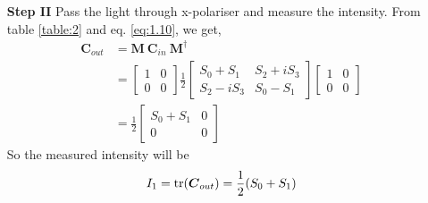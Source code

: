 \documentclass[11pt,a4paper]{article}
\numberwithin{equation}{section}
\begin{document}
\begin{enumerate}
 \item[\textbf{Step II}] 
 Pass the light through x-polariser and measure the intensity. From table \ref{table:2} and eq. \ref{eq:1.10}, we get,
 \begin{align}
 	\boldsymbol{C}_{out} &= \boldsymbol{M}\:\boldsymbol{C}_{in}\:\boldsymbol{M}^\dagger\nonumber\\
 	&=\begin{bmatrix} 1 & 0 \\ 0 & 0 \end{bmatrix} 
 	\frac{1}{2} \begin{bmatrix} S_0+S_1 & S_2+iS_3 \\ S_2-iS_3 & S_0-S_1\end{bmatrix}
 	\begin{bmatrix} 1 & 0 \\ 0 & 0 \end{bmatrix}\nonumber\\
 	&= \frac{1}{2} \begin{bmatrix} S_0+S_1 & 0 \\ 0 & 0\end{bmatrix}
 \end{align}
 So the measured intensity will be 
 \begin{align}
 	I_1 = \tr(\boldsymbol{C}_{out}) = \frac{1}{2} (S_0+S_1) \label{s II}
 \end{align}


\end{enumerate}
\end{document}
